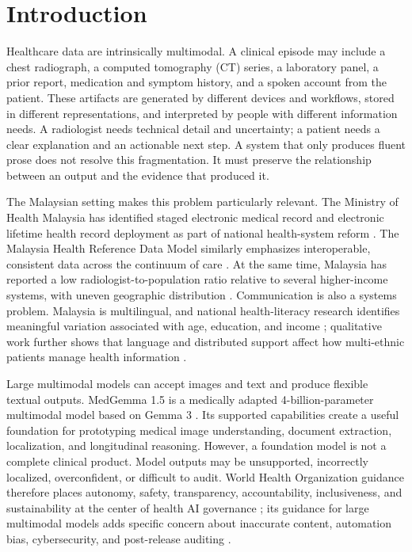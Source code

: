 \documentclass[conference]{IEEEtran}
\begin{document}
\section{Introduction}

Healthcare data are intrinsically multimodal. A clinical episode may include a chest radiograph, a computed tomography (CT) series, a laboratory panel, a prior report, medication and symptom history, and a spoken account from the patient. These artifacts are generated by different devices and workflows, stored in different representations, and interpreted by people with different information needs. A radiologist needs technical detail and uncertainty; a patient needs a clear explanation and an actionable next step. A system that only produces fluent prose does not resolve this fragmentation. It must preserve the relationship between an output and the evidence that produced it.

The Malaysian setting makes this problem particularly relevant. The Ministry of Health Malaysia has identified staged electronic medical record and electronic lifetime health record deployment as part of national health-system reform \cite{moh2023whitepaper}. The Malaysia Health Reference Data Model similarly emphasizes interoperable, consistent data across the continuum of care \cite{mohmyhrdm}. At the same time, Malaysia has reported a low radiologist-to-population ratio relative to several higher-income systems, with uneven geographic distribution \cite{ramli2023radiologist}. Communication is also a systems problem. Malaysia is multilingual, and national health-literacy research identifies meaningful variation associated with age, education, and income \cite{jaafar2021literacy}; qualitative work further shows that language and distributed support affect how multi-ethnic patients manage health information \cite{rajan2021multilingual}.

Large multimodal models can accept images and text and produce flexible textual outputs. MedGemma 1.5 is a medically adapted 4-billion-parameter multimodal model based on Gemma 3 \cite{sellergren2026medgemma,gemmateam2025gemma3}. Its supported capabilities create a useful foundation for prototyping medical image understanding, document extraction, localization, and longitudinal reasoning. However, a foundation model is not a complete clinical product. Model outputs may be unsupported, incorrectly localized, overconfident, or difficult to audit. World Health Organization guidance therefore places autonomy, safety, transparency, accountability, inclusiveness, and sustainability at the center of health AI governance \cite{who2021ethics}; its guidance for large multimodal models adds specific concern about inaccurate content, automation bias, cybersecurity, and post-release auditing \cite{who2024lmm}.
\end{document}
